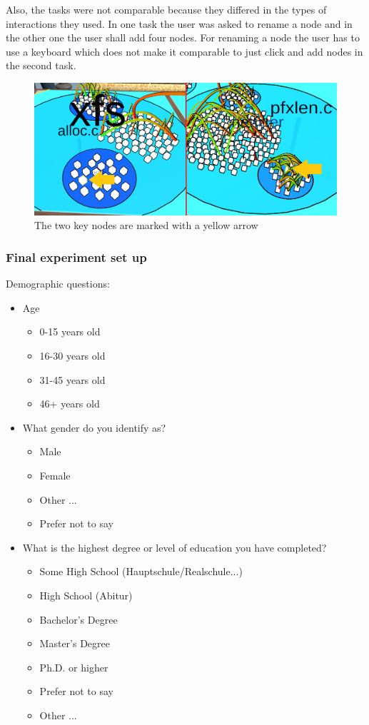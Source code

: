 Also, the tasks were not comparable because they differed in the types of interactions they used.
In one task the user was asked to rename a node and in the other one the user shall add four nodes.
For renaming a node the user has to use a keyboard which does not make it comparable to just click and add nodes in the second task.




\begin{figure}[htb]
    \centering
    \includegraphics[width=1\textwidth]{Evaluation/img/task1.png}
    \caption{The two key nodes are marked with a yellow arrow}\label{fig:task1}
\end{figure}

\subsubsection{Final experiment set up}

Demographic questions:
\begin{itemize}
    \item Age
    \begin{itemize}
        \item 0-15 years old
        \item 16-30 years old
        \item 31-45 years old
        \item 46+ years old
    \end{itemize}
    \item What gender do you identify as?
    \begin{itemize}
        \item Male
        \item Female
        \item Other ...
        \item Prefer not to say
    \end{itemize}
    \item What is the highest degree or level of education you have completed?
    \begin{itemize}
        \item Some High School (Hauptschule/Realschule...)
        \item High School (Abitur)
        \item Bachelor's Degree
        \item Master's Degree
        \item Ph.D. or higher
        \item Prefer not to say
        \item Other ...
    \end{itemize}
\end{itemize}

